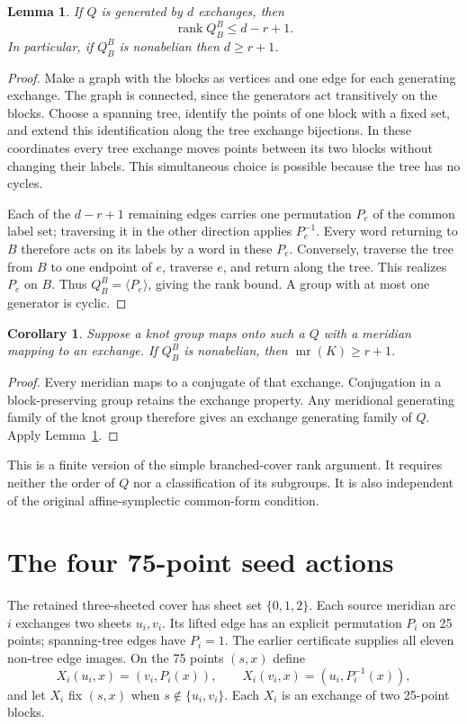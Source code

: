\documentclass[11pt]{article}
\newtheorem{lemma}[theorem]{Lemma}
\newtheorem{corollary}[theorem]{Corollary}
\newcommand{\mr}{\operatorname{mr}}
\newcommand{\rank}{\operatorname{rank}}
\begin{document}
\begin{lemma}\label{lem:gauge}
If $Q$ is generated by $d$ exchanges, then
\[
                         \rank Q_B^B\le d-r+1.
\]
In particular, if $Q_B^B$ is nonabelian then $d\ge r+1$.
\end{lemma}
\begin{proof}
Make a graph with the blocks as vertices and one edge for
each generating exchange. The graph is connected, since
the generators act transitively on the blocks. Choose a
spanning tree, identify the points of one block with a fixed
set, and extend this identification along the tree exchange
bijections. In these coordinates every tree exchange moves
points between its two blocks without changing their labels.
This simultaneous choice is possible because the tree has
no cycles.

Each of the $d-r+1$ remaining edges carries one permutation
$P_e$ of the common label set; traversing it in the other
direction applies $P_e^{-1}$. Every word returning to $B$
therefore acts on its labels by a word in these $P_e$.
Conversely, traverse the tree from $B$ to one endpoint of
$e$, traverse $e$, and return along the tree. This realizes
$P_e$ on $B$. Thus $Q_B^B=\langle P_e\rangle$, giving the
rank bound. A group with at most one generator is cyclic.
\end{proof}

\begin{corollary}\label{cor:finite}
Suppose a knot group maps onto such a $Q$ with a meridian
mapping to an exchange. If $Q_B^B$ is nonabelian, then
$\mr(K)\ge r+1$.
\end{corollary}
\begin{proof}
Every meridian maps to a conjugate of that exchange.
Conjugation in a block-preserving group retains the exchange
property. Any meridional generating family of the knot
group therefore gives an exchange generating family of $Q$.
Apply Lemma~\ref{lem:gauge}.
\end{proof}

This is a finite version of the simple branched-cover rank
argument. It requires neither the order of $Q$ nor a
classification of its subgroups. It is also independent of
the original affine-symplectic common-form condition.

\section{The four 75-point seed actions}

The retained three-sheeted cover has sheet set $\{0,1,2\}$.
Each source meridian arc $i$ exchanges two sheets $u_i,v_i$.
Its lifted edge has an explicit permutation $P_i$ on 25
points; spanning-tree edges have $P_i=1$. The earlier
certificate supplies all eleven non-tree edge images.
On the 75 points $(s,x)$ define
\[
 X_i(u_i,x)=(v_i,P_i(x)),\qquad
 X_i(v_i,x)=(u_i,P_i^{-1}(x)),
\]
and let $X_i$ fix $(s,x)$ when $s\notin\{u_i,v_i\}$.
Each $X_i$ is an exchange of two 25-point blocks.
\end{document}
